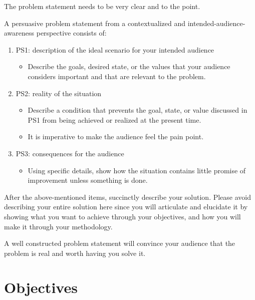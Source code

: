 The problem statement needs to be very clear and to the point. 

\noindent A persuasive problem statement from a contextualized and intended-audience-awareness perspective consists of:

\begin{enumerate}
	\item PS1: description of the ideal scenario for your intended audience	
	\begin{itemize}
		\item Describe the goals, desired state, or the values that your audience considers important and that are relevant to the problem.
	\end{itemize}
	
	\item PS2:  reality of the situation
	\begin{itemize}
			\item Describe a condition that prevents the goal, state, or value discussed in PS1 from being achieved or realized at the present time.
			\item It is imperative to make the audience feel the pain point.
	\end{itemize}
	
	\item PS3:  consequences for the audience		
	\begin{itemize}
			\item Using specific details, show how the situation contains little promise of improvement unless something is done.
	\end{itemize}

\end{enumerate}

\noindent After the above-mentioned items, succinctly describe your solution.  Please avoid describing your entire solution here since you will articulate and elucidate it by showing what you want to achieve through your objectives, and how you will make it through your methodology.

\noindent A well constructed problem statement will convince your audience that the problem is real and worth having you solve it.



\graytx{\blindtext}



\section{Objectives}

